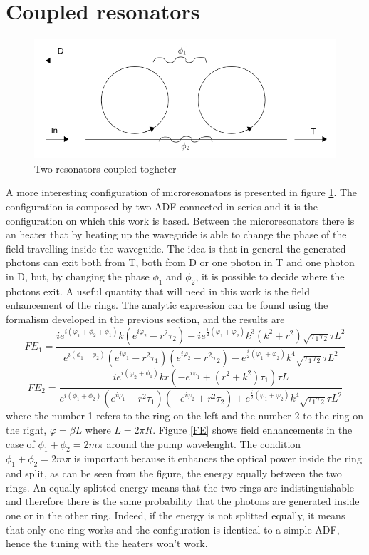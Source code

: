 \section{Coupled resonators}\label{coupled}
\begin{figure}[H]
\centering
\includegraphics[width = .7\textwidth]{img/coupled}
\caption{Two resonators coupled togheter}
\label{resonatorcoupled}
\end{figure}
A more interesting configuration of microresonators is presented in figure \ref{resonatorcoupled}. The configuration is composed by two ADF connected in series and it is the configuration on which this work is based. Between the microresonators there is an heater that by heating up the waveguide is able to change the phase of the field travelling inside the waveguide. The idea is that in general the generated photons can exit both from T, both from D or one photon in T and one photon in D, but, by changing the phase $\phi_1$ and $\phi_2$, it is possible to decide where the photons exit. A useful quantity that will need in this work is the field enhancement of the rings. The analytic expression can be found using the formalism developed in the previous section, and the results are
\[FE_1 = \frac{ie^{i(\varphi_1+\phi_2+\phi_1)}k (e^{i\varphi_2}-r^2\tau_2)-ie^{\frac{i}{2}(\varphi_1+\varphi_2)}k^3(k^2+r^2)\sqrt{\tau_1\tau_2}\tau L^2}{e^{i(\phi_1+\phi_2)}(e^{i\varphi_1}-r^2\tau_1)(e^{i\varphi_2}-r^2\tau_2)-e^{\frac{i}{2}(\varphi_1+\varphi_2)}k^4\sqrt{\tau_1\tau_2}\tau L^2}\]
\[FE_2 = \frac{ie^{i(\varphi_2+\phi_1)}kr (-e^{i\varphi_1}+(r^2+k^2)\tau_1)\tau L}{e^{i(\phi_1+\phi_2)}(e^{i\varphi_1}-r^2\tau_1)(-e^{i\varphi_2}+r^2\tau_2)+e^{\frac{i}{2}(\varphi_1+\varphi_2)}k^4\sqrt{\tau_1\tau_2}\tau L^2}\]
where the number 1 refers to the ring on the left and the number 2 to the ring on the right, $\varphi = \beta L$ where $L=2\pi R$. Figure \ref{FE} shows field enhancements in the case of $\phi_1 + \phi_2 = 2m\pi$ around the pump wavelenght. The condition $\phi_1 + \phi_2 = 2m\pi$ is important because it enhances the optical power inside the ring and split, as can be seen from the figure, the energy equally between the two rings. An equally splitted energy means that the two rings are indistinguishable and therefore there is the same probability that the photons are generated inside one or in the other ring. Indeed, if the energy is not splitted equally, it means that only one ring works and the configuration is identical to a simple ADF, hence the tuning with the heaters won't work. 


